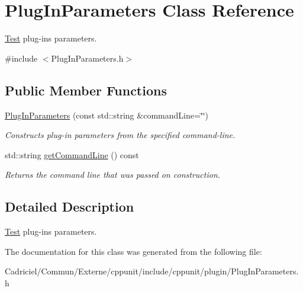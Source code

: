 \hypertarget{class_plug_in_parameters}{}\section{Plug\+In\+Parameters Class Reference}
\label{class_plug_in_parameters}


\hyperlink{class_test}{Test} plug-\/ins parameters.  




{\ttfamily \#include $<$Plug\+In\+Parameters.\+h$>$}

\subsection*{Public Member Functions}
\begin{DoxyCompactItemize}
\item 
\hyperlink{class_plug_in_parameters_acbf183c92faaa4e17dc66dec87ddc033}{Plug\+In\+Parameters} (const std\+::string \&command\+Line=\char`\"{}\char`\"{})\hypertarget{class_plug_in_parameters_acbf183c92faaa4e17dc66dec87ddc033}{}\label{class_plug_in_parameters_acbf183c92faaa4e17dc66dec87ddc033}

\begin{DoxyCompactList}\small\item\em Constructs plug-\/in parameters from the specified command-\/line. \end{DoxyCompactList}\item 
std\+::string \hyperlink{class_plug_in_parameters_aad9dfbb3f1745b72154ab6b70948d629}{get\+Command\+Line} () const \hypertarget{class_plug_in_parameters_aad9dfbb3f1745b72154ab6b70948d629}{}\label{class_plug_in_parameters_aad9dfbb3f1745b72154ab6b70948d629}

\begin{DoxyCompactList}\small\item\em Returns the command line that was passed on construction. \end{DoxyCompactList}\end{DoxyCompactItemize}


\subsection{Detailed Description}
\hyperlink{class_test}{Test} plug-\/ins parameters. 

The documentation for this class was generated from the following file\+:\begin{DoxyCompactItemize}
\item 
Cadriciel/\+Commun/\+Externe/cppunit/include/cppunit/plugin/Plug\+In\+Parameters.\+h\end{DoxyCompactItemize}
